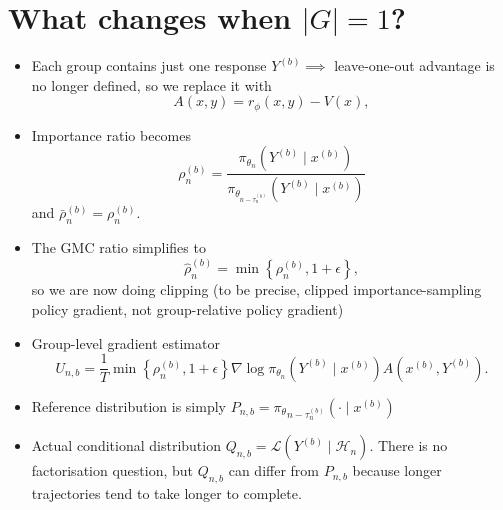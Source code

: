 \newpage 

\section*{What changes when $|G|=1$?}

\begin{itemize}
    \item Each group contains just one response $Y^{(b)} \implies$  leave-one-out advantage is no longer defined, so we replace it with
    \begin{equation*}
         A(x, y)=r_\phi(x, y)-V(x),   
    \end{equation*}
    \item Importance ratio becomes 
    \begin{equation}
    \rho_n^{(b)}=\frac{\pi_{\theta_n}\left(Y^{(b)} \mid x^{(b)}\right)}{\pi_{\theta_{n-\tau_n^{(b)}}}\left(Y^{(b)} \mid x^{(b)}\right)} 
    \end{equation}
    and $\bar{\rho}_n^{(b)}=\rho_n^{(b)} .$
    \item The GMC ratio simplifies to
    \begin{equation*}
        \hat{\rho}_n^{(b)}=\min \left\{\rho_n^{(b)}, 1+\epsilon\right\},
    \end{equation*}
    so we are now doing clipping (to be precise, clipped importance-sampling policy gradient, not group-relative policy gradient)
    \item Group-level gradient estimator
    \begin{equation*}
        U_{n, b}=\frac{1}{T} \min \left\{\rho_n^{(b)}, 1+\epsilon\right\} \nabla \log \pi_{\theta_n}\left(Y^{(b)} \mid x^{(b)}\right) A\left(x^{(b)}, Y^{(b)}\right).
    \end{equation*}
    \item Reference distribution is simply $P_{n, b}=\pi_\theta{ }_{n-\tau_n^{(b)}}\left(\cdot \mid x^{(b)}\right)$
    \item Actual conditional distribution $Q_{n, b}=\mathcal{L}\left(Y^{(b)} \mid \mathcal{H}_n\right)$. There is no factorisation question, but $Q_{n, b}$ can differ from $P_{n, b}$ because longer trajectories tend to take longer to complete.
\end{itemize}

